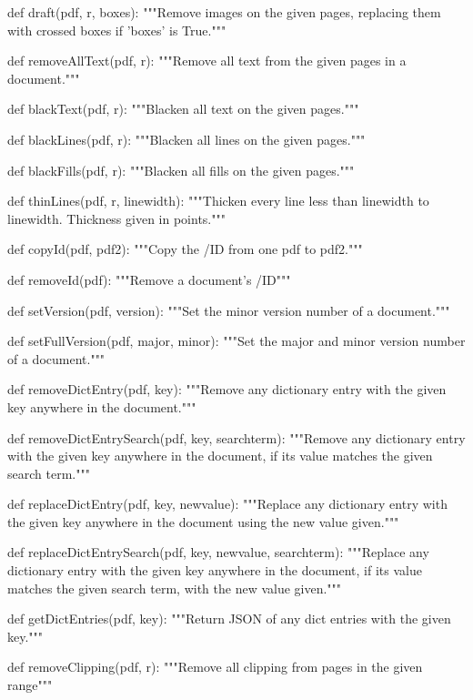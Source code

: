 def draft(pdf, r, boxes):
    """Remove images on the given pages, replacing them with crossed boxes if
    'boxes' is True."""

def removeAllText(pdf, r):
    """Remove all text from the given pages in a document."""

def blackText(pdf, r):
    """Blacken all text on the given pages."""

def blackLines(pdf, r):
    """Blacken all lines on the given pages."""

def blackFills(pdf, r):
    """Blacken all fills on the given pages."""

def thinLines(pdf, r, linewidth):
    """Thicken every line less than linewidth to linewidth. Thickness given in
    points."""

def copyId(pdf, pdf2):
    """Copy the /ID from one pdf to pdf2."""

def removeId(pdf):
    """Remove a document's /ID"""

def setVersion(pdf, version):
    """Set the minor version number of a document."""

def setFullVersion(pdf, major, minor):
    """Set the major and minor version number of a document."""

def removeDictEntry(pdf, key):
    """Remove any dictionary entry with the given key anywhere in the
    document."""

def removeDictEntrySearch(pdf, key, searchterm):
    """Remove any dictionary entry with the given key anywhere in the document,
    if its value matches the given search term."""

def replaceDictEntry(pdf, key, newvalue):
    """Replace any dictionary entry with the given key anywhere in the document
    using the new value given."""

def replaceDictEntrySearch(pdf, key, newvalue, searchterm):
    """Replace any dictionary entry with the given key anywhere in the
    document, if its value matches the given search term, with the new value
    given."""

def getDictEntries(pdf, key):
    """Return JSON of any dict entries with the given key."""

def removeClipping(pdf, r):
    """Remove all clipping from pages in the given range"""
